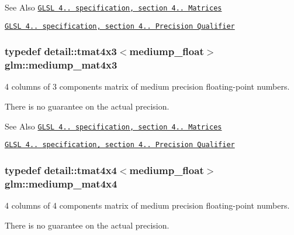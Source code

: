 \begin{DoxySeeAlso}{See Also}
\href{http://www.opengl.org/registry/doc/GLSLangSpec.4.20.8.pdf}{\tt G\-L\-S\-L 4.. specification, section 4.. Matrices} 

\href{http://www.opengl.org/registry/doc/GLSLangSpec.4.20.8.pdf}{\tt G\-L\-S\-L 4.. specification, section 4.. Precision Qualifier} 
\end{DoxySeeAlso}
\hypertarget{group__core__precision_ga2c1b39d629d83063a0d59cf14b4f52a3}{
\subsubsection[{mediump\-\_\-mat4x3}]{\setlength{\rightskip}{0pt plus 5cm}typedef detail\-::tmat4x3$<$mediump\-\_\-float$>$ {\bf glm\-::mediump\-\_\-mat4x3}}}\label{group__core__precision_ga2c1b39d629d83063a0d59cf14b4f52a3}


4 columns of 3 components matrix of medium precision floating-\/point numbers. 

There is no guarantee on the actual precision.

\begin{DoxySeeAlso}{See Also}
\href{http://www.opengl.org/registry/doc/GLSLangSpec.4.20.8.pdf}{\tt G\-L\-S\-L 4.. specification, section 4.. Matrices} 

\href{http://www.opengl.org/registry/doc/GLSLangSpec.4.20.8.pdf}{\tt G\-L\-S\-L 4.. specification, section 4.. Precision Qualifier} 
\end{DoxySeeAlso}
\hypertarget{group__core__precision_ga6023cdb8df00d662cb6c1bce2632381a}{
\subsubsection[{mediump\-\_\-mat4x4}]{\setlength{\rightskip}{0pt plus 5cm}typedef detail\-::tmat4x4$<$mediump\-\_\-float$>$ {\bf glm\-::mediump\-\_\-mat4x4}}}\label{group__core__precision_ga6023cdb8df00d662cb6c1bce2632381a}


4 columns of 4 components matrix of medium precision floating-\/point numbers. 

There is no guarantee on the actual precision.

